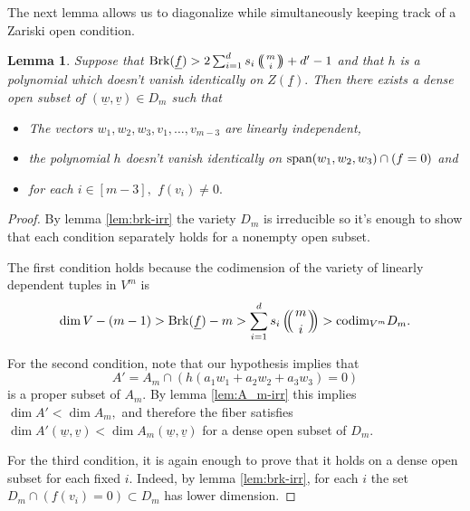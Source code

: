 \documentclass[12pt]{amsart}
\let\ul\underline
\newtheorem{lemma}[theorem]{Lemma}
\theoremstyle{definition}
\def\multiset#1#2{\ensuremath{\left(\kern-.3em\left(\genfrac{}{}{0pt}{}{#1}{#2}\right)\kern-.3em\right)}}
\renewcommand{\sp}{\textnormal{span}}
\newcommand{\codim}{\textnormal{codim}}
\newcommand{\brk}{\textnormal{Brk}}
\let\ul\underline
\begin{document}
    The next lemma allows us to diagonalize while simultaneously keeping track of a Zariski open condition.

    \begin{lemma}
        Suppose that $\brk(\ul{f}) > 2\sum_{i=1}^d s_i \multiset{m}{i}+d'-1$ and that $h$ is a polynomial which doesn't vanish identically on $Z(\ul{f}).$ Then there exists a dense open subset of $(\ul{w},\ul{v})\in D_m$ such that 
        \begin{itemize}
        \item The vectors $w_1,w_2,w_3,v_1,\ldots,v_{m-3}$ are linearly independent,
        \item the polynomial $h$ doesn't vanish identically on $\sp(w_1,w_2,w_3)\cap (f=0)$ and 
        \item for each $i\in [m-3],$ $f(v_i) \neq 0.$ 
        \end{itemize}
    \end{lemma}

    \begin{proof}
         By lemma \ref{lem:brk-irr} the variety $D_m$ is irreducible so it's enough to show that each condition separately holds for a nonempty open subset.
         
         The first condition holds because the codimension of the variety of linearly dependent tuples in $V^m$ is
        \[
        \dim V - (m-1) > \brk(\ul{f}) - m > \sum_{i=1}^d s_i \multiset{m}{i} > \codim_{V^m} D_m. 
        \]
      
      For the second condition, note that our hypothesis implies that 
      $$A' = A_m \cap (h(a_1w_1+a_2w_2+a_3w_3) = 0)$$ is a proper subset of $A_m.$ By lemma \ref{lem:A_m-irr} this implies $\dim A' < \dim A_m,$  and therefore the fiber satisfies  $\dim A'(\ul{w},\ul{v}) < \dim A_m(\ul{w},\ul{v})$ for a dense open subset of $D_m.$ 
      
    For the third condition, it is again enough to prove that it holds on a dense open subset for each fixed $i.$ Indeed, by lemma \ref{lem:brk-irr}, for each $i$ the set $D_m\cap (f(v_i) =0) \subset D_m$ has lower dimension.
    \end{proof}
\end{document}
